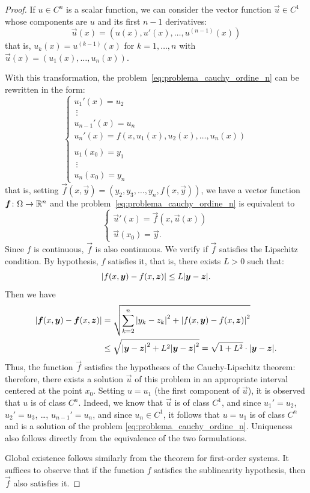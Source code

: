 \begin{proof}
If $u\in C^n$ is a scalar function, we can consider the vector function $\vec u
\in C^1$ whose components are $u$ and its first $n-1$ derivatives:
\[
\vec u(x) = (u(x), u'(x), \dots, u^{(n-1)}(x))
\]
that is, $u_k(x) = u^{(k-1)}(x)$ for $k=1,\dots ,n$ with $\vec u(x) = (u_1(x),
\dots, u_n(x))$.

With this transformation, the problem~\eqref{eq:problema_cauchy_ordine_n} can be
rewritten in the form:
\[
 \begin{cases}
   u_1'(x) = u_2 \\
   \ \vdots \\
   u_{n-1}'(x) = u_n \\
   u_n'(x) = f(x, u_1(x), u_2(x), \dots, u_n(x))\\\\
   u_1(x_0) = y_1\\
   \ \vdots \\
   u_{n}(x_0) = y_n
 \end{cases}
\]
that is, setting $\vec f(x,\vec y) = (y_2, y_3, \dots, y_n, f(x, \vec y))$, we
have a vector function $\boldsymbol f\colon \Omega \to {\mathbb R}^n$ and the
problem~\eqref{eq:problema_cauchy_ordine_n} is equivalent to
\begin{equation}\label{eq:437583}
  \begin{cases}
   \vec u'(x) = \vec f(x,\vec u(x))\\
   \vec u(x_0) = \vec y.
  \end{cases}
\end{equation}
Since $f$ is continuous, $\vec f$ is also continuous. We verify if $\vec f$
satisfies the Lipschitz condition. By hypothesis, $f$ satisfies it, that is,
there exists $L>0$ such that:
\[
  {\left|f(x,\boldsymbol y)-f(x,\boldsymbol z)\right|} \le L{\left|\boldsymbol y - \boldsymbol z\right|}.
\]
Then we have
\begin{align*}
{\left|\boldsymbol f(x,\boldsymbol y) - \boldsymbol f(x,\boldsymbol z)\right|}
  &= \sqrt{\sum_{k=2}^n {\left|y_k-z_k\right|}^2 + {\left|f(x,\boldsymbol y)-f(x,\boldsymbol z)\right|}^2} \\
  &\le \sqrt{{\left|\boldsymbol y - \boldsymbol z\right|}^2 + L^2 {\left|\boldsymbol y - \boldsymbol z\right|}^2}
  = \sqrt{1+L^2}\cdot {\left|\boldsymbol y - \boldsymbol z\right|}.
\end{align*}
Thus, the function $\vec f$ satisfies the hypotheses of the Cauchy-Lipschitz
theorem: therefore, there exists a solution $\vec u$ of this problem in an
appropriate interval centered at the point $x_0$. Setting $u=u_1$ (the first
component of $\vec u$), it is observed that $u$ is of class $C^n$. Indeed, we
know that $\vec u$ is of class $C^1$, and since $u_1' = u_2$, $u_2' = u_3$,
\dots, $u_{n-1}'=u_n$, and since $u_n\in C^1$, it follows that $u=u_1$ is of
class $C^n$ and is a solution of the problem
\eqref{eq:problema_cauchy_ordine_n}. Uniqueness also follows directly from the
equivalence of the two formulations.

Global existence follows similarly from the theorem for first-order systems. It
suffices to observe that if the function $f$ satisfies the sublinearity
hypothesis, then $\vec f$ also satisfies it.
\end{proof}